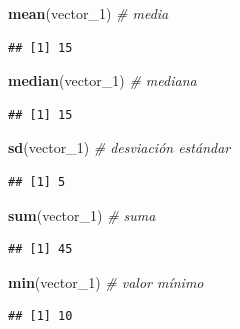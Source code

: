 \documentclass[]{book}
\newenvironment{Shaded}{\begin{snugshade}}{\end{snugshade}}
\newcommand{\KeywordTok}[1]{\textcolor[rgb]{0.13,0.29,0.53}{\textbf{#1}}}
\newcommand{\DecValTok}[1]{\textcolor[rgb]{0.00,0.00,0.81}{#1}}
\newcommand{\CommentTok}[1]{\textcolor[rgb]{0.56,0.35,0.01}{\textit{#1}}}
\newcommand{\NormalTok}[1]{#1}
\begin{document}
\begin{Shaded}
\begin{Highlighting}[]
\KeywordTok{mean}\NormalTok{(vector_}\DecValTok{1}\NormalTok{) }\CommentTok{# media}
\end{Highlighting}
\end{Shaded}

\begin{verbatim}
## [1] 15
\end{verbatim}

\begin{Shaded}
\begin{Highlighting}[]
\KeywordTok{median}\NormalTok{(vector_}\DecValTok{1}\NormalTok{) }\CommentTok{# mediana}
\end{Highlighting}
\end{Shaded}

\begin{verbatim}
## [1] 15
\end{verbatim}

\begin{Shaded}
\begin{Highlighting}[]
\KeywordTok{sd}\NormalTok{(vector_}\DecValTok{1}\NormalTok{) }\CommentTok{# desviación estándar}
\end{Highlighting}
\end{Shaded}

\begin{verbatim}
## [1] 5
\end{verbatim}

\begin{Shaded}
\begin{Highlighting}[]
\KeywordTok{sum}\NormalTok{(vector_}\DecValTok{1}\NormalTok{) }\CommentTok{# suma}
\end{Highlighting}
\end{Shaded}

\begin{verbatim}
## [1] 45
\end{verbatim}

\begin{Shaded}
\begin{Highlighting}[]
\KeywordTok{min}\NormalTok{(vector_}\DecValTok{1}\NormalTok{) }\CommentTok{# valor mínimo}
\end{Highlighting}
\end{Shaded}

\begin{verbatim}
## [1] 10
\end{verbatim}
\end{document}

